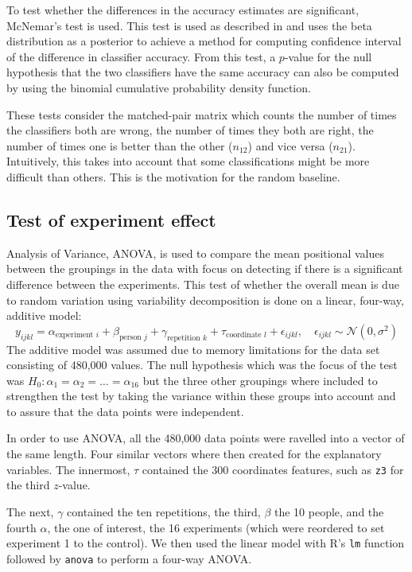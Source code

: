 \documentclass[11pt,fleqn]{article}
\begin{document}
To test whether the differences in the accuracy estimates are significant, McNemar's test is used. 
This test is used as described in \cite[Method 11.3.2]{Tue} and uses the beta distribution as a posterior to achieve a method for computing confidence interval of the difference in classifier accuracy.
From this test, a \(p\)-value for the null hypothesis that the two classifiers have the same accuracy can also be computed by using the binomial cumulative probability density function.

These tests consider the matched-pair matrix which counts the number of times the classifiers both are wrong, the number of times they both are right, the number of times one is better than the other (\(n_{12}\)) and vice versa (\(n_{21}\)).
Intuitively, this takes into account that some classifications might be more difficult than others. 
This is the motivation for the random baseline.
\subsection{Test of experiment effect}\label{subsec:expeffect}
Analysis of Variance, ANOVA, is used to compare the mean positional values between the groupings in the data with focus on detecting if there is a significant difference between the experiments.
This test of whether the overall mean is due to random variation using variability decomposition is done on a linear, four-way, additive model:
\[
y_{ijkl} = \alpha_{\text{experiment } i}+
\beta_{\text{person } j}
+ \gamma_{\text{repetition } k}+
\tau_{\text{coordinate } l}
+ \epsilon_{ijkl}, \quad \epsilon_{ijkl} \sim \mathcal N (0, \sigma^2)
\]
The additive model was assumed due to memory limitations for the data set consisting of 480,000 values.
The null hypothesis which was the focus of the test was $ H_0: \alpha_1=\alpha_2=\ldots=\alpha_{16} $ but the three other groupings where included to strengthen the test by taking the variance within these groups into account and to assure that the data points were independent. 

In order to use ANOVA, all the 480,000 data points were ravelled into a vector of the same length.
Four similar vectors where then created for the explanatory variables.
The innermost, \(\tau\) contained the 300 coordinates features, such as \texttt{z3} for the third $ z $-value.

The next, \(\gamma\) contained the ten repetitions, the third, \(\beta\) the 10 people, and the fourth \(\alpha \), the one of interest, the 16 experiments (which were reordered to set experiment 1 to the control).
We then used the linear model with R's \texttt{lm} function followed by \texttt{anova} to perform a four-way ANOVA.
\end{document}
